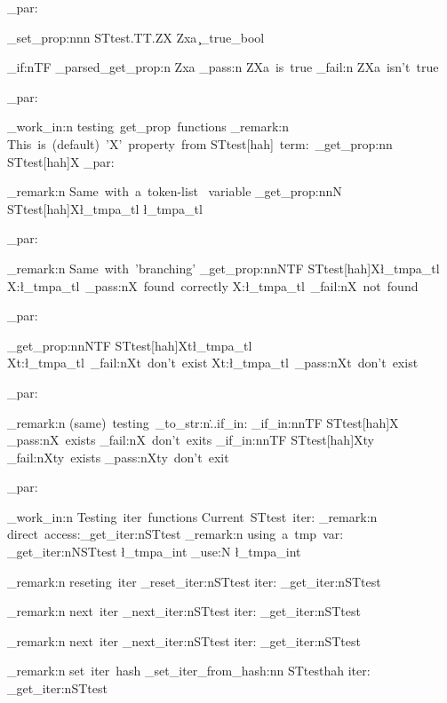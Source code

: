 \documentclass{article}
\begin{document}
\sttests_par:


  
\starray_set_prop:nnn {STtest.TT.ZX}  {Zxa} {\c_true_bool}

\bool_if:nTF { \starray_parsed_get_prop:n {Zxa} }
  {  \sttests_pass:n {ZXa~is~true } }
  {   \sttests_fail:n {ZXa~isn't~true } }





\sttests_par:

  
  
\sttests_work_in:n {testing~get_prop~functions}
\sttests_remark:n {This~is~(default)~'X'~property~from STtest[hah]~term:~}\starray_get_prop:nn {STtest[hah]}{X}
\sttests_par:


\sttests_remark:n {Same~with~a~token-list~ variable}
\starray_get_prop:nnN {STtest[hah]}{X}\l_tmpa_tl
\l_tmpa_tl

\sttests_par:

\sttests_remark:n {Same~with~'branching'}
\starray_get_prop:nnNTF {STtest[hah]}{X}\l_tmpa_tl
  {X:\l_tmpa_tl~\sttests_pass:n{X~found~correctly}}
  {X:\l_tmpa_tl~\sttests_fail:n{X~not~found}}

\sttests_par:

\starray_get_prop:nnNTF {STtest[hah]}{Xt}\l_tmpa_tl
  {Xt:\l_tmpa_tl~\sttests_fail:n{Xt~don't~exist}}
  {Xt:\l_tmpa_tl~\sttests_pass:n{Xt~don't~exist}}

\sttests_par:

\sttests_remark:n {(same)~testing~\tl_to_str:n{\...if_in:}}
\starray_if_in:nnTF {STtest[hah]}{X}
  {\sttests_pass:n{X~exists}}
  {\sttests_fail:n{X~don't~exits}}
\starray_if_in:nnTF {STtest[hah]}{Xty}
  {\sttests_fail:n{Xty~exists}}
  {\sttests_pass:n{Xty~don't~exit}}

 
\sttests_par:


\sttests_work_in:n {Testing~iter~functions}
Current~STtest~iter: 
\sttests_remark:n {direct~access:\starray_get_iter:n{STtest}}
\sttests_remark:n {using~a~tmp~var: \starray_get_iter:nN{STtest} \l_tmpa_int \int_use:N \l_tmpa_int}

\sttests_remark:n {reseting~iter} \starray_reset_iter:n{STtest}
iter: \starray_get_iter:n{STtest}

\sttests_remark:n {next~iter} \starray_next_iter:n{STtest}
iter: \starray_get_iter:n{STtest}

\sttests_remark:n {next~iter} \starray_next_iter:n{STtest}
iter: \starray_get_iter:n{STtest}


\sttests_remark:n {set~iter~hash} \starray_set_iter_from_hash:nn {STtest}{hah}
iter: \starray_get_iter:n{STtest}
\end{document}

